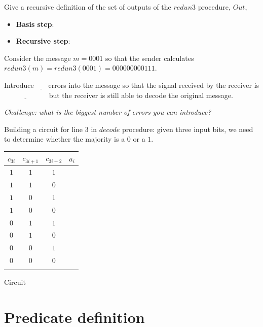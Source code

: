 \documentclass[12pt, oneside]{article}
\begin{document}
Give a recursive definition of the set of outputs of the $redun3$ procedure, $Out$,

\vspace{-20pt}

\begin{itemize}
\item[] {\bf Basis step}: \underline{ \phantom{$\lambda \in Out$ \qquad}}
\item[] {\bf Recursive step}: \underline{\phantom{If $x \in Out$ then $x000 \in Out$ and $x111 \in Out$} }
\end{itemize}


Consider the message $m = 0001$ so that the sender calculates $redun3(m) = redun3(0001) = 000000000111$.

Introduce $\underline{\phantom{~~4~~}} $
errors into the message so that the signal received by the 
receiver is $\underline{\phantom{010100010101}}$
but the receiver is still able to decode the original message.

\vspace{-10pt}

{\it Challenge: what is the biggest number of errors you can introduce?} 

Building a circuit for line 3 in $decode$ procedure: given three input bits, we need to determine whether the
majority is a $0$ or a $1$.

\begin{center}
\begin{multicols}{2}\begin{tabular}{ccc|c}
$c_{3i}$ & $c_{3i+1}$ & $c_{3i+2}$ & $a_i$ \\
\hline
$1$ & $1$ & $1$ & $\phantom{1}$ \\
$1$ & $1$ & $0$ & $\phantom{1}$ \\
$1$ & $0$ & $1$ & $\phantom{1}$ \\
$1$ & $0$ & $0$ & $\phantom{0}$ \\
$0$ & $1$ & $1$ & $\phantom{1}$ \\
$0$ & $1$ & $0$ & $\phantom{0}$ \\
$0$ & $0$ & $1$ & $\phantom{0}$ \\
$0$ & $0$ & $0$ & $\phantom{0}$ \\\\
\end{tabular}
\columnbreak

Circuit 
\end{multicols}
\end{center} \vfill
\section*{Predicate definition}
\end{document}
